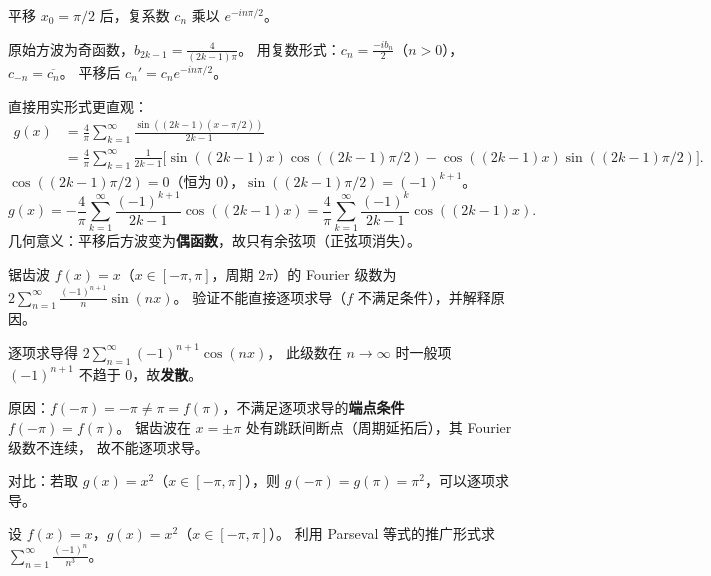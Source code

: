 \documentclass{ctexart}
\begin{document}
\begin{solution}
  平移 $x_0 = \pi/2$ 后，复系数 $c_n$ 乘以 $e^{-in\pi/2}$。

  原始方波为奇函数，$b_{2k-1} = \frac{4}{(2k-1)\pi}$。
  用复数形式：$c_n = \frac{-ib_n}{2}$（$n > 0$），$c_{-n} = \overline{c_n}$。
  平移后 $c_n' = c_n e^{-in\pi/2}$。

  直接用实形式更直观：
  \begin{align*}
    g(x) &= \frac{4}{\pi}\sum_{k=1}^\infty \frac{\sin((2k-1)(x-\pi/2))}{2k-1} \\
    &= \frac{4}{\pi}\sum_{k=1}^\infty \frac{1}{2k-1}
    \bigl[\sin((2k-1)x)\cos((2k-1)\pi/2) - \cos((2k-1)x)\sin((2k-1)\pi/2)\bigr].
  \end{align*}
  $\cos((2k-1)\pi/2) = 0$（恒为 0），$\sin((2k-1)\pi/2) = (-1)^{k+1}$。
  \[
    g(x) = -\frac{4}{\pi}\sum_{k=1}^\infty \frac{(-1)^{k+1}}{2k-1}\cos((2k-1)x)
    = \frac{4}{\pi}\sum_{k=1}^\infty \frac{(-1)^{k}}{2k-1}\cos((2k-1)x).
  \]
  几何意义：平移后方波变为\textbf{偶函数}，故只有余弦项（正弦项消失）。
\end{solution}

\begin{exercise}
  锯齿波 $f(x) = x$（$x \in [-\pi,\pi]$，周期 $2\pi$）的 Fourier 级数为
  $2\sum_{n=1}^\infty \frac{(-1)^{n+1}}{n}\sin(nx)$。
  验证不能直接逐项求导（$f$ 不满足条件），并解释原因。
\end{exercise}

\begin{solution}
  逐项求导得 $2\sum_{n=1}^\infty (-1)^{n+1}\cos(nx)$，
  此级数在 $n\to\infty$ 时一般项 $(-1)^{n+1}$ 不趋于 $0$，故\textbf{发散}。

  原因：$f(-\pi) = -\pi \ne \pi = f(\pi)$，不满足逐项求导的\textbf{端点条件} $f(-\pi) = f(\pi)$。
  锯齿波在 $x = \pm\pi$ 处有跳跃间断点（周期延拓后），其 Fourier 级数不连续，
  故不能逐项求导。

  对比：若取 $g(x) = x^2$（$x \in [-\pi,\pi]$），则 $g(-\pi) = g(\pi) = \pi^2$，可以逐项求导。
\end{solution}

\begin{exercise}
  设 $f(x) = x$，$g(x) = x^2$（$x \in [-\pi,\pi]$）。
  利用 Parseval 等式的推广形式求 $\displaystyle\sum_{n=1}^\infty \frac{(-1)^n}{n^3}$。
\end{exercise}
\end{document}
